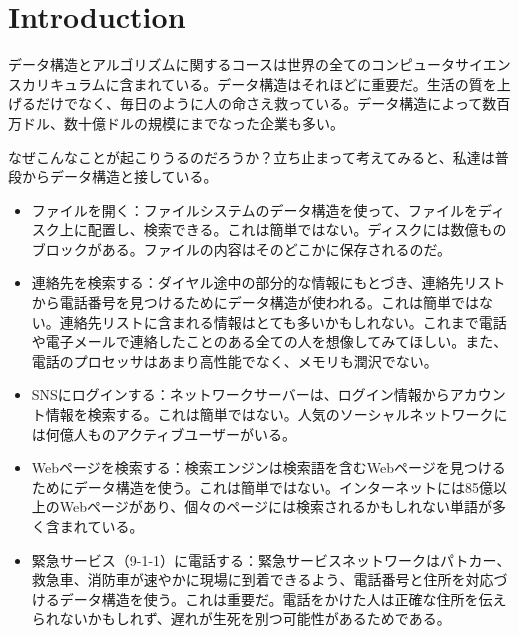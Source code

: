 \chapter{Introduction}

データ構造とアルゴリズムに関するコースは世界の全てのコンピュータサイエンスカリキュラムに含まれている。データ構造はそれほどに重要だ。生活の質を上げるだけでなく、毎日のように人の命さえ救っている。データ構造によって数百万ドル、数十億ドルの規模にまでなった企業も多い。

なぜこんなことが起こりうるのだろうか？立ち止まって考えてみると、私達は普段からデータ構造と接している。
\begin{itemize}
	\item ファイルを開く：ファイルシステムのデータ構造を使って、ファイルをディスク上に配置し、検索できる。これは簡単ではない。ディスクには数億ものブロックがある。ファイルの内容はそのどこかに保存されるのだ。
	\item 連絡先を検索する：ダイヤル途中の部分的な情報にもとづき、連絡先リストから電話番号を見つけるためにデータ構造が使われる。これは簡単ではない。連絡先リストに含まれる情報はとても多いかもしれない。これまで電話や電子メールで連絡したことのある全ての人を想像してみてほしい。また、電話のプロセッサはあまり高性能でなく、メモリも潤沢でない。
	\item SNSにログインする：ネットワークサーバーは、ログイン情報からアカウント情報を検索する。これは簡単ではない。人気のソーシャルネットワークには何億人ものアクティブユーザーがいる。
	\item Webページを検索する：検索エンジンは検索語を含むWebページを見つけるためにデータ構造を使う。これは簡単ではない。インターネットには85億以上のWebページがあり、個々のページには検索されるかもしれない単語が多く含まれている。
	\item 緊急サービス（9-1-1）に電話する：緊急サービスネットワークはパトカー、救急車、消防車が速やかに現場に到着できるよう、電話番号と住所を対応づけるデータ構造を使う。これは重要だ。電話をかけた人は正確な住所を伝えられないかもしれず、遅れが生死を別つ可能性があるためである。
\end{itemize}

